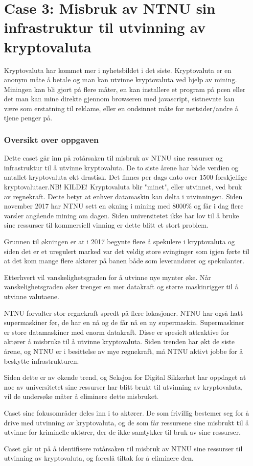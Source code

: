 \section{Case 3: Misbruk av NTNU sin infrastruktur til utvinning av kryptovaluta}
\label{sec:case_krypto}
Kryptovaluta har kommet mer i nyhetsbildet i det siste. Kryptovaluta er en anonym måte å betale og man kan utvinne kryptovaluta ved hjelp av mining. Miningen kan bli gjort på flere måter, en kan installere et program på pcen eller det man kan mine direkte gjennom browseren med javascript, sistnevnte kan være som erstatning til reklame, eller en ondsinnet måte for nettsider/andre å tjene penger på.



\subsubsection{Oversikt over oppgaven}
Dette caset går inn på rotårsaken til misbruk av NTNU sine ressurser og infrastruktur til å utvinne kryptovaluta. De to siste årene har både verdien og antallet kryptovaluta økt drastisk. Det finnes per dags dato over 1500 forskjellige kryptovalutaer.NB! KILDE! 
Kryptovaluta blir "minet", eller utvinnet, ved bruk av regnekraft. Dette betyr at enhver datamaskin kan delta i utvinningen. Siden november 2017 har NTNU sett en økning i mining med 8000\% og får i dag flere varsler angående mining om dagen. Siden universitetet ikke har lov til å bruke sine ressurser til kommersiell vinning er dette blitt et stort problem. 

Grunnen til økningen er at i 2017 begynte flere å spekulere i kryptovaluta og siden det er et uregulert marked var det veldig store svinginger som igjen førte til at det kom mange flere aktører på banen både som leverandører og spekulanter. 

Etterhvert vil vanskelighetsgraden for å utvinne nye mynter øke. Når vanskelighetsgraden øker trenger en mer datakraft og større maskinrigger til å utvinne valutaene. 

NTNU forvalter stor regnekraft spredt på flere lokasjoner. NTNU har også hatt supermaskiner før, de har en nå og de får nå en ny supermaskin. Supermaskiner er store datamaskiner med enorm datakraft. Disse er spesielt attraktive for aktører å misbruke til å utvinne kryptovaluta. Siden trenden har økt de siste årene, og NTNU er i besittelse av mye regnekraft, må NTNU aktivt jobbe for å beskytte infrastrukturen. 

Siden dette er av økende trend, og Seksjon for Digital Sikkerhet har oppdaget at noe av universitetet sine ressurser har blitt brukt til utvinning av kryptovaluta, vil de undersøke måter å eliminere dette misbruket. 

Caset sine fokusområder deles inn i to aktører. De som frivillig bestemer seg for å drive med utvinning av kryptovaluta, og de som får ressursene sine misbrukt til å utvinne for kriminelle aktører, der de ikke samtykker til bruk av sine ressurser.

Caset går ut på å identifisere rotårsaken til misbruk av NTNU sine ressurser til utvinning av kryptovaluta, og foreslå tiltak for å eliminere den.
